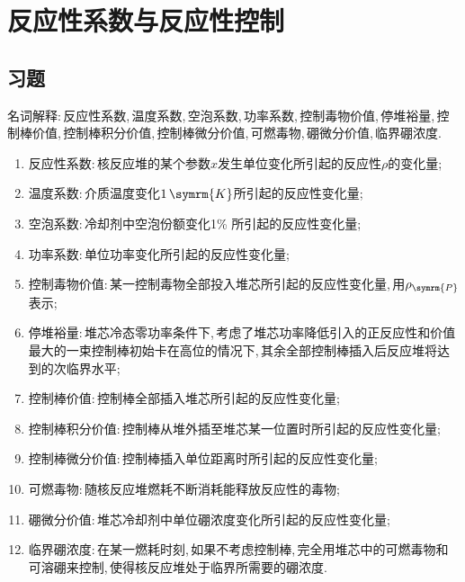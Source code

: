 \chapter{反应性系数与反应性控制}
\section*{习题}

\begin{exercise}
    名词解释:\,反应性系数,\,温度系数,\,空泡系数,\,功率系数,\,控制毒物价值,\,停堆裕量,\,控制棒价值,\,控制棒积分价值,\,控制棒微分价值,\,可燃毒物,\,硼微分价值,\,临界硼浓度.\,
    \begin{solution}
        \begin{enumerate}[(1)]
            \item 反应性系数:\,核反应堆的某个参数$x$发生单位变化所引起的反应性$\rho$的变化量;\,
            \item 温度系数:\,介质温度变化$1\,\symrm{K}$所引起的反应性变化量;\,
            \item 空泡系数:\,冷却剂中空泡份额变化1\% 所引起的反应性变化量;\,
            \item 功率系数:\,单位功率变化所引起的反应性变化量;\,
            \item 控制毒物价值:\,某一控制毒物全部投入堆芯所引起的反应性变化量,\,用$\rho_{\symrm{P}}$表示;\,
            \item 停堆裕量:\,堆芯冷态零功率条件下,\,考虑了堆芯功率降低引入的正反应性和价值最大的一束控制棒初始卡在高位的情况下,\,其余全部控制棒插入后反应堆将达到的次临界水平;\,
            \item 控制棒价值:\,控制棒全部插入堆芯所引起的反应性变化量;\,
            \item 控制棒积分价值:\,控制棒从堆外插至堆芯某一位置时所引起的反应性变化量;\,
            \item 控制棒微分价值:\,控制棒插入单位距离时所引起的反应性变化量;\,
            \item 可燃毒物:\,随核反应堆燃耗不断消耗能释放反应性的毒物;\,
            \item 硼微分价值:\,堆芯冷却剂中单位硼浓度变化所引起的反应性变化量;\,
            \item 临界硼浓度:\,在某一燃耗时刻,\,如果不考虑控制棒,\,完全用堆芯中的可燃毒物和可溶硼来控制,\,使得核反应堆处于临界所需要的硼浓度.\,
        \end{enumerate}
    \end{solution}
\end{exercise}

